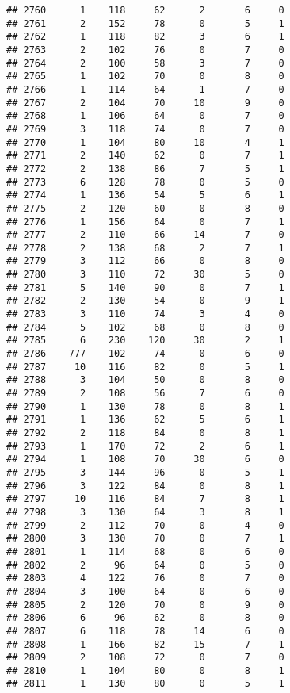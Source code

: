 \documentclass[
]{article}
\begin{document}
\begin{verbatim}
## 2760      1    118     62      2       6     0
## 2761      2    152     78      0       5     1
## 2762      1    118     82      3       6     1
## 2763      2    102     76      0       7     0
## 2764      2    100     58      3       7     0
## 2765      1    102     70      0       8     0
## 2766      1    114     64      1       7     0
## 2767      2    104     70     10       9     0
## 2768      1    106     64      0       7     0
## 2769      3    118     74      0       7     0
## 2770      1    104     80     10       4     1
## 2771      2    140     62      0       7     1
## 2772      2    138     86      7       5     1
## 2773      6    128     78      0       5     0
## 2774      1    136     54      5       6     1
## 2775      2    120     60      0       8     0
## 2776      1    156     64      0       7     1
## 2777      2    110     66     14       7     0
## 2778      2    138     68      2       7     1
## 2779      3    112     66      0       8     0
## 2780      3    110     72     30       5     0
## 2781      5    140     90      0       7     1
## 2782      2    130     54      0       9     1
## 2783      3    110     74      3       4     0
## 2784      5    102     68      0       8     0
## 2785      6    230    120     30       2     1
## 2786    777    102     74      0       6     0
## 2787     10    116     82      0       5     1
## 2788      3    104     50      0       8     0
## 2789      2    108     56      7       6     0
## 2790      1    130     78      0       8     1
## 2791      1    136     62      5       6     1
## 2792      2    118     84      0       8     1
## 2793      1    170     72      2       6     1
## 2794      1    108     70     30       6     0
## 2795      3    144     96      0       5     1
## 2796      3    122     84      0       8     1
## 2797     10    116     84      7       8     1
## 2798      3    130     64      3       8     1
## 2799      2    112     70      0       4     0
## 2800      3    130     70      0       7     1
## 2801      1    114     68      0       6     0
## 2802      2     96     64      0       5     0
## 2803      4    122     76      0       7     0
## 2804      3    100     64      0       6     0
## 2805      2    120     70      0       9     0
## 2806      6     96     62      0       8     0
## 2807      6    118     78     14       6     0
## 2808      1    166     82     15       7     1
## 2809      2    108     72      0       7     0
## 2810      1    104     80      0       8     1
## 2811      1    130     80      0       5     1

\end{verbatim}
\end{document}
